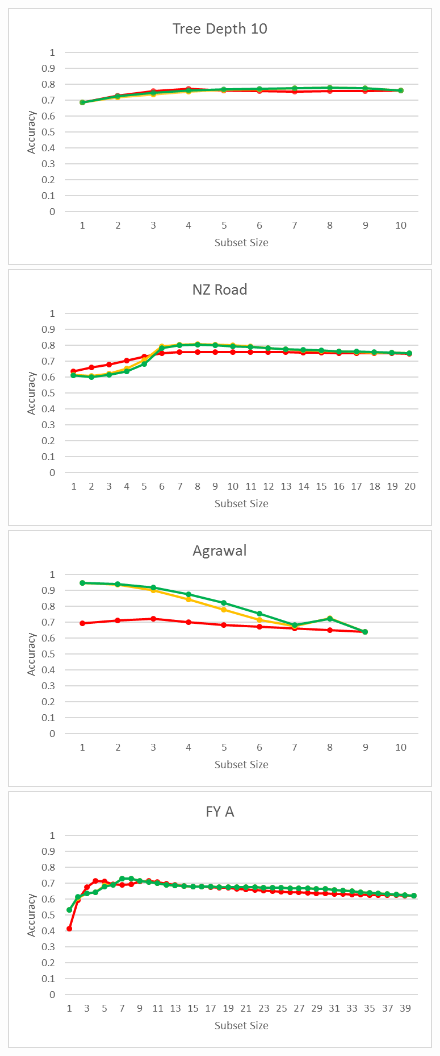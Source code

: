 \begin{figure}[h]
\begin{center}
\includegraphics[scale=0.25]{Graphs/AccuracyDifference/TreeD10}
\includegraphics[scale=0.25]{Graphs/AccuracyDifference/NZRoad20}
\includegraphics[scale=0.25]{Graphs/AccuracyDifference/Agrawal}
\includegraphics[scale=0.25]{Graphs/AccuracyDifference/FY_A}

\end{center}
\end{figure}
